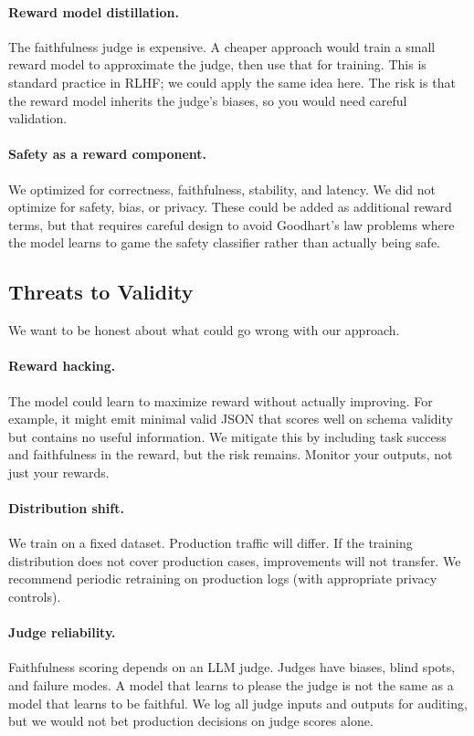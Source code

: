 \documentclass[11pt]{article}
\begin{document}
\paragraph{Reward model distillation.}
The faithfulness judge is expensive.
A cheaper approach would train a small reward model to approximate the judge, then use that for training.
This is standard practice in RLHF; we could apply the same idea here.
The risk is that the reward model inherits the judge's biases, so you would need careful validation.

\paragraph{Safety as a reward component.}
We optimized for correctness, faithfulness, stability, and latency.
We did not optimize for safety, bias, or privacy.
These could be added as additional reward terms, but that requires careful design to avoid Goodhart's law problems where the model learns to game the safety classifier rather than actually being safe.

\subsection{Threats to Validity}

We want to be honest about what could go wrong with our approach.

\paragraph{Reward hacking.}
The model could learn to maximize reward without actually improving.
For example, it might emit minimal valid JSON that scores well on schema validity but contains no useful information.
We mitigate this by including task success and faithfulness in the reward, but the risk remains.
Monitor your outputs, not just your rewards.

\paragraph{Distribution shift.}
We train on a fixed dataset.
Production traffic will differ.
If the training distribution does not cover production cases, improvements will not transfer.
We recommend periodic retraining on production logs (with appropriate privacy controls).

\paragraph{Judge reliability.}
Faithfulness scoring depends on an LLM judge.
Judges have biases, blind spots, and failure modes.
A model that learns to please the judge is not the same as a model that learns to be faithful.
We log all judge inputs and outputs for auditing, but we would not bet production decisions on judge scores alone.
\end{document}
